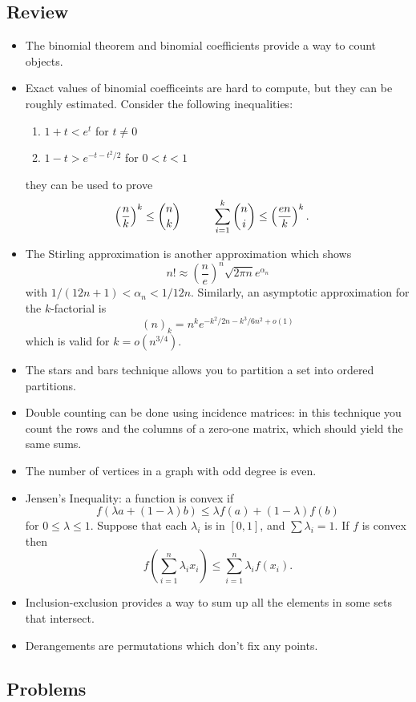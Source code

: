 \subsection{Review}
\begin{itemize}
	\item The binomial theorem and binomial coefficients provide a way to count objects.
	\item Exact values of binomial coefficeints are hard to compute, but they can be roughly estimated. Consider the following inequalities:
	\begin{enumerate}
		\item $1+t<e^t$ for $t\neq 0$
		\item $1-t>e^{-t-t^2/2}$ for $0<t<1$
	\end{enumerate}
	they can be used to prove 
	\begin{align*}
		\left(\frac{n}{k}\right)^k\leq\binom{n}{k}&\hspace{10mm} \sum_{i=1}^k\binom{n}{i}\leq \left(\frac{en}{k}\right)^k.
	\end{align*}
	\item The Stirling approximation is another approximation which shows
	$$n!\approx\left(\frac{n}{e}\right)^n\sqrt{2\pi n}e^{\alpha_n}$$
	with $1/(12n+1)<\alpha_n<1/12n$. Similarly, an asymptotic approximation for the $k$-factorial is
	$$(n)_k=n^ke^{-k^2/2n-k^3/6n^2+o(1)}$$ which is valid for $k=o(n^{3/4}).$
	\item The stars and bars technique allows you to partition a set into ordered partitions.
	\item Double counting can be done using incidence matrices: in this technique you count the rows and the columns of a zero-one matrix, which should yield the same sums.
	\item The number of vertices in a graph with odd degree is even.
	\item Jensen's Inequality: a function is convex if 
	$$f(\lambda a+(1-\lambda)b)\leq \lambda f(a)+(1-\lambda)f(b)$$
	for $0\leq\lambda\leq 1$. Suppose that each $\lambda_i$ is in $[0,1]$, and $\sum\lambda_i=1$. If $f$ is convex then
	$$f\left(\sum_{i=1}^n\lambda_ix_i\right)\leq\sum_{i=1}^n\lambda_if(x_i).$$
	\item Inclusion-exclusion provides a way to sum up all the elements in some sets that intersect.
	\item Derangements are permutations which don't fix any points.
\end{itemize}

\subsection{Problems}

